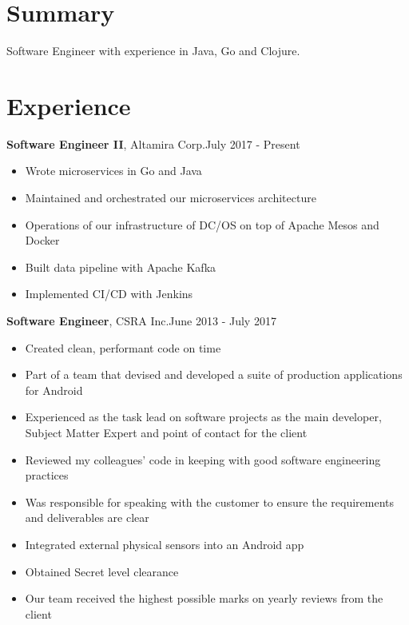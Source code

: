 \documentclass[line, margin, 10pt]{res} \setlength{\parskip}{9pt}
\begin{document}
\renewcommand{\namefont}{ \LARGE \bf }

 \address{chrispickard9@gmail.com} \address{pickard.cc}

\begin{resume}
  \section{Summary}
  Software Engineer with experience in Java, Go and Clojure.

  \section{Experience}


  {\bf Software Engineer II}, Altamira Corp.\hfill July 2017 - Present
  \begin{itemize} \itemsep -2pt %
  \item Wrote microservices in Go and Java
  \item Maintained and orchestrated our microservices architecture
  \item Operations of our infrastructure of DC/OS on top of Apache Mesos and Docker
  \item Built data pipeline with Apache Kafka
  \item Implemented CI/CD with Jenkins
  \end{itemize}

  {\bf Software Engineer}, CSRA Inc.\hfill June 2013 - July 2017
  \begin{itemize} \itemsep -2pt %
  \item Created clean, performant code on time
  \item Part of a team that devised and developed a suite of production applications for Android
  \item Experienced as the task lead on software projects as the main developer,
    Subject Matter Expert and point of contact for the client
  \item Reviewed my colleagues' code in keeping with good software engineering practices
  \item Was responsible for speaking with the customer to ensure the requirements and deliverables are clear
  \item Integrated external physical sensors into an Android app
  \item Obtained Secret level clearance
  \item Our team received the highest possible marks on yearly reviews from the client
  \end{itemize}



\end{resume}
\end{document}
